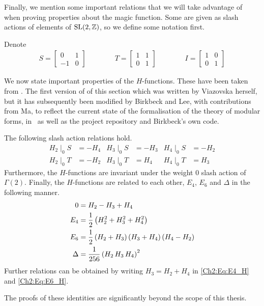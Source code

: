 Finally, we mention some important relations that we will take advantage of when proving properties about the magic function. Some are given as slash actions of elements of $\operatorname{SL}\!\left( 2, \mathbb{Z} \right)$, so we define some notation first.

\begin{boxnotation}
    Denote
    \begin{align*}
        S = \begin{bmatrix}
            0 & 1 \\ -1 & 0
        \end{bmatrix}
        \qquad \qquad
        T = \begin{bmatrix}
            1 & 1 \\ 0 & 1
        \end{bmatrix}
        \qquad \qquad
        I = \begin{bmatrix}
            1 & 0 \\ 0 & 1
        \end{bmatrix}
    \end{align*}
\end{boxnotation}

We now state important properties of the $H$-functions. These have been taken from \cite[\S 6]{blueprint}. The first version of of this section which was written by Viazovska herself, but it has subsequently been modified by Birkbeck and Lee, with contributions from Ma, to reflect the current state of the formalisation of the theory of modular forms, in \mathlib\ as well as the project repository and Birkbeck's own code.

\begin{boxproposition}\label{Ch2:Prop:H_Rels}
    The following slash action relations hold.
    \begin{align*}
        H_2 \mid_0 S &= -H_4
        &
        H_3 \mid_0 S &= -H_3
        &
        H_4 \mid_0 S &= -H_2
        \\
        H_2 \mid_0 T &= -H_2
        &
        H_3 \mid_0 T &= H_4
        &
        H_4 \mid_0 T &= H_3
    \end{align*}
    Furthermore, the $H$-functions are invariant under the weight $0$ slash action of $\Gamma(2)$. Finally, the $H$-functions are related to each other, $E_4$, $E_6$ and $\Delta$ in the following manner.
    \begin{align}
        0 &= H_2 - H_3 + H_4 \label{Ch2:Eq:H_Jacobi} \\
        E_4 &= \frac{1}{2} \left( H_2^2 + H_3^2 + H_4^2 \right) \label{Ch2:Eq:E4_H} \\
        E_6 &= \frac{1}{2} \left( H_2 + H_3 \right)\left( H_3 + H_4 \right)\left( H_4 - H_2 \right) \label{Ch2:Eq:E6_H} \\
        \Delta &= \frac{1}{256} \left( H_2 \, H_3 \, H_4 \right)^2 \label{Ch2:Eq:Disc_H}
    \end{align}
    Further relations can be obtained by writing $H_3 = H_2 + H_4$ in \eqref{Ch2:Eq:E4_H} and \eqref{Ch2:Eq:E6_H}.
\end{boxproposition}

The proofs of these identities are significantly beyond the scope of this thesis.
